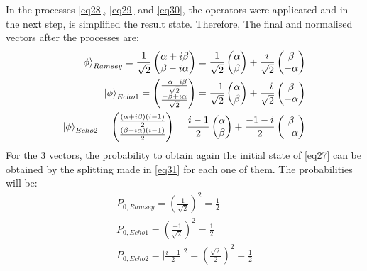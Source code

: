 \documentclass{article}
\begin{document}
In the processes \ref{eq28}, \ref{eq29} and \ref{eq30}, the operators were applicated and in the next step, is simplified the result state. Therefore, The final and normalised vectors after the processes are:
\begin{equation}\label{eq31}\begin{aligned}\ket{\phi}_{Ramsey}=\frac{1}{\sqrt{2}}\begin{pmatrix}\alpha+i\beta\\\beta-i\alpha  \end{pmatrix}=\frac{1}{\sqrt{2}}\begin{pmatrix}\alpha\\ \beta\end{pmatrix}+\frac{i}{\sqrt{2}}\begin{pmatrix}\beta \\ -\alpha\end{pmatrix}\\ \ket{\phi}_{Echo 1}= \begin{pmatrix} \frac{-\alpha-i\beta}{\sqrt{2}} \\ \frac{-\beta+i\alpha}{\sqrt{2}} \end{pmatrix}=\frac{-1}{\sqrt{2}}\begin{pmatrix}\alpha\\ \beta\end{pmatrix}+\frac{-i}{\sqrt{2}}\begin{pmatrix}\beta \\ -\alpha\end{pmatrix}\\ \ket{\phi}_{Echo 2}= \begin{pmatrix} \frac{(\alpha+i\beta)(i-1)}{2}\\\frac{(\beta-i\alpha)(i-1)}{2} \end{pmatrix}=\frac{i-1}{2}\begin{pmatrix}\alpha\\ \beta\end{pmatrix}+\frac{-1-i}{2}\begin{pmatrix}\beta \\-\alpha\end{pmatrix}\end{aligned}\end{equation}
For the 3 vectors, the probability to obtain again the initial state of \ref{eq27} can be obtained by the splitting made in \ref{eq31} for each one of them. The probabilities will be:
\begin{equation}\label{eq32}\begin{aligned}P_{0, Ramsey}=(\frac{1}{\sqrt{2}})^2=\frac{1}{2}\\P_{0,Echo1}=(\frac{-1}{\sqrt{2}})^2=\frac{1}{2}\\P_{0,Echo2}=\rvert\frac{i-1}{2}\lvert^2=(\frac{\sqrt{2}}{2})^2=\frac{1}{2}\end{aligned}\end{equation}
\end{document}
